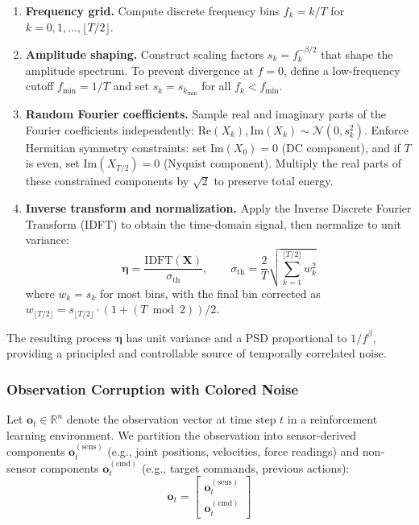 \begin{enumerate}
  \item \textbf{Frequency grid.}
        Compute discrete frequency bins $f_k = k / T$ for $k = 0, 1, \ldots, \lfloor T/2 \rfloor$.
  \item \textbf{Amplitude shaping.}
        Construct scaling factors $s_k = f_k^{-\beta/2}$ that shape the amplitude spectrum.
        To prevent divergence at $f = 0$, define a low-frequency cutoff $f_{\min} = 1/T$ and set $s_k = s_{k_{\min}}$ for all $f_k < f_{\min}$.
  \item \textbf{Random Fourier coefficients.}
        Sample real and imaginary parts of the Fourier coefficients independently:
        $\mathrm{Re}(X_k), \mathrm{Im}(X_k) \sim \mathcal{N}(0, s_k^2)$.
        Enforce Hermitian symmetry constraints: set $\mathrm{Im}(X_0) = 0$ (DC component), and if $T$ is even, set $\mathrm{Im}(X_{T/2}) = 0$ (Nyquist component).
        Multiply the real parts of these constrained components by $\sqrt{2}$ to preserve total energy.
  \item \textbf{Inverse transform and normalization.}
        Apply the Inverse Discrete Fourier Transform (IDFT) to obtain the time-domain signal, then normalize to unit variance:
        \begin{equation}
          \boldsymbol{\eta} = \frac{\mathrm{IDFT}(\boldsymbol{X})}{\sigma_{\mathrm{th}}}, \qquad
          \sigma_{\mathrm{th}} = \frac{2}{T} \sqrt{\sum_{k=1}^{\lfloor T/2 \rfloor} w_k^2}
          \label{eq:normalization}
        \end{equation}
        where $w_k = s_k$ for most bins, with the final bin corrected as $w_{\lfloor T/2 \rfloor} = s_{\lfloor T/2 \rfloor} \cdot (1 + (T \bmod 2))/2$.
\end{enumerate}

The resulting process $\boldsymbol{\eta}$ has unit variance and a PSD proportional to $1/f^\beta$, providing a principled and controllable source of temporally correlated noise.

\subsubsection{Observation Corruption with Colored Noise}

Let $\boldsymbol{o}_t \in \mathbb{R}^{n}$ denote the observation vector at time step $t$ in a reinforcement learning environment.
We partition the observation into sensor-derived components $\boldsymbol{o}_t^{\mathrm{(sens)}}$ (e.g., joint positions, velocities, force readings) and non-sensor components $\boldsymbol{o}_t^{\mathrm{(cmd)}}$ (e.g., target commands, previous actions):
\begin{equation}
  \boldsymbol{o}_t = \begin{bmatrix} \boldsymbol{o}_t^{\mathrm{(sens)}} \\ \boldsymbol{o}_t^{\mathrm{(cmd)}} \end{bmatrix}
\end{equation}


